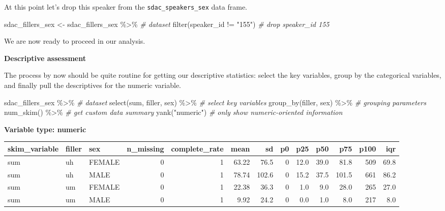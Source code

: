 \documentclass[
]{article}
\newenvironment{Shaded}{\begin{snugshade}}{\end{snugshade}}
\newcommand{\CommentTok}[1]{\textcolor[rgb]{0.56,0.35,0.01}{\textit{#1}}}
\newcommand{\FunctionTok}[1]{\textcolor[rgb]{0.00,0.00,0.00}{#1}}
\newcommand{\NormalTok}[1]{#1}
\newcommand{\OtherTok}[1]{\textcolor[rgb]{0.56,0.35,0.01}{#1}}
\newcommand{\SpecialCharTok}[1]{\textcolor[rgb]{0.00,0.00,0.00}{#1}}
\newcommand{\StringTok}[1]{\textcolor[rgb]{0.31,0.60,0.02}{#1}}
\begin{document}
At this point let's drop this speaker from the \texttt{sdac\_speakers\_sex} data frame.

\begin{Shaded}
\begin{Highlighting}[]
\NormalTok{sdac\_fillers\_sex }\OtherTok{\textless{}{-}} 
\NormalTok{  sdac\_fillers\_sex }\SpecialCharTok{\%\textgreater{}\%} \CommentTok{\# dataset}
  \FunctionTok{filter}\NormalTok{(speaker\_id }\SpecialCharTok{!=} \StringTok{"155"}\NormalTok{) }\CommentTok{\# drop speaker\_id 155}
\end{Highlighting}
\end{Shaded}

We are now ready to proceed in our analysis.

\textbf{Descriptive assessment}

The process by now should be quite routine for getting our descriptive statistics: select the key variables, group by the categorical variables, and finally pull the descriptives for the numeric variable.

\begin{Shaded}
\begin{Highlighting}[]
\NormalTok{sdac\_fillers\_sex }\SpecialCharTok{\%\textgreater{}\%} \CommentTok{\# dataset}
  \FunctionTok{select}\NormalTok{(sum, filler, sex) }\SpecialCharTok{\%\textgreater{}\%} \CommentTok{\# select key variables}
  \FunctionTok{group\_by}\NormalTok{(filler, sex) }\SpecialCharTok{\%\textgreater{}\%} \CommentTok{\# grouping parameters}
  \FunctionTok{num\_skim}\NormalTok{() }\SpecialCharTok{\%\textgreater{}\%} \CommentTok{\# get custom data summary}
  \FunctionTok{yank}\NormalTok{(}\StringTok{"numeric"}\NormalTok{) }\CommentTok{\# only show numeric{-}oriented information}
\end{Highlighting}
\end{Shaded}

\textbf{Variable type: numeric}

\begin{tabular}{l|l|l|r|r|r|r|r|r|r|r|r|r}
\hline
skim\_variable & filler & sex & n\_missing & complete\_rate & mean & sd & p0 & p25 & p50 & p75 & p100 & iqr\\
\hline
sum & uh & FEMALE & 0 & 1 & 63.22 & 76.5 & 0 & 12.0 & 39.0 & 81.8 & 509 & 69.8\\
\hline
sum & uh & MALE & 0 & 1 & 78.74 & 102.6 & 0 & 15.2 & 37.5 & 101.5 & 661 & 86.2\\
\hline
sum & um & FEMALE & 0 & 1 & 22.38 & 36.3 & 0 & 1.0 & 9.0 & 28.0 & 265 & 27.0\\
\hline
sum & um & MALE & 0 & 1 & 9.92 & 24.2 & 0 & 0.0 & 1.0 & 8.0 & 217 & 8.0\\
\hline
\end{tabular}
\end{document}
